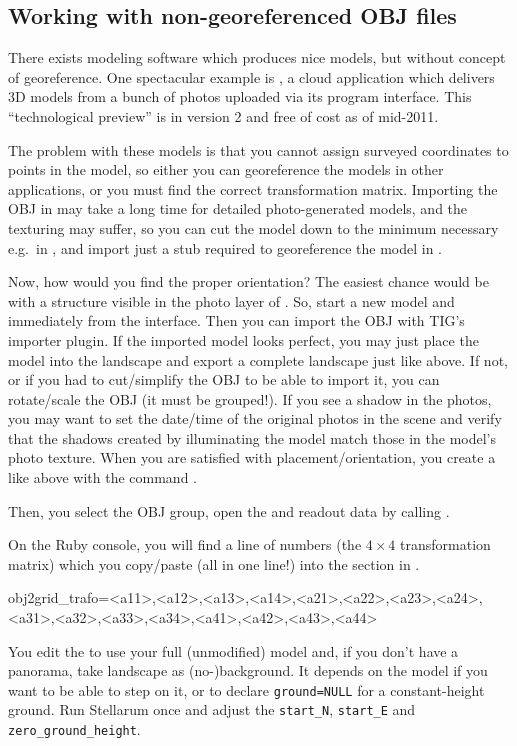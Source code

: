 \subsection{Working with non-georeferenced OBJ files}
\label{sec:scenery3d:NonGeoreferenced}


There exists modeling software which produces nice models, but without
concept of georeference. One spectacular example is ,
a cloud application which delivers 3D models from a bunch of photos
uploaded via its program interface. This ``technological preview'' is
in version 2 and free of cost as of mid-2011.

The problem with these models is that you cannot assign surveyed
coordinates to points in the model, so either you can georeference the
models in other applications, or you must find the correct
transformation matrix.  Importing the OBJ in  may take a long
time for detailed photo-generated models, and the texturing may
suffer, so you can cut the model down to the minimum necessary e.g.\ in
, and import just a stub required to georeference the model in
. 

Now, how would you find the proper orientation? The easiest chance
would be with a structure visible in the photo layer of . So, start a new model and immediately  from the
 interface. Then you can import the OBJ with TIG's importer
plugin.  If the imported model looks perfect, you may just place the
model into the  landscape and export a complete landscape just
like above. If not, or if you had to cut/simplify the OBJ to be able
to import it, you can rotate/scale the OBJ (it must be grouped!). If
you see a shadow in the photos, you may want to set the date/time of
the original photos in the scene and verify that the shadows created by
 illuminating the model match those in the model's photo
texture. When you are satisfied with placement/orientation, you create
a  like above with the command
.

Then, you select the OBJ group, open the  and readout data by calling
.

On the Ruby console, you will find a line of numbers (the $4\times4$
transformation matrix) which you copy/paste (all in one line!) into the
\file{[model]} section in .
\begin{configfile}
obj2grid_trafo=<a11>,<a12>,<a13>,<a14>,<a21>,<a22>,<a23>,<a24>,
               <a31>,<a32>,<a33>,<a34>,<a41>,<a42>,<a43>,<a44>
\end{configfile}
You edit the  to use your full (unmodified)
 model and, if you don't have a panorama, take 
landscape as (no-)background. It depends on the model if you want to
be able to step on it, or to declare \texttt{ground=NULL} for a
constant-height ground. Run Stellarum once and adjust the
\texttt{start\_N}, \texttt{start\_E} and \texttt{zero\_ground\_height}.

